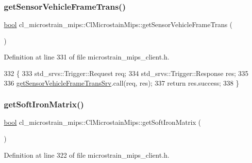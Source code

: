 \subsubsection{\texorpdfstring{get\+Sensor\+Vehicle\+Frame\+Trans()}{getSensorVehicleFrameTrans()}}
{\footnotesize\ttfamily \hyperlink{classbool}{bool} cl\+\_\+microstrain\+\_\+mips\+::\+Cl\+Microstain\+Mips\+::get\+Sensor\+Vehicle\+Frame\+Trans (\begin{DoxyParamCaption}{ }\end{DoxyParamCaption})\hspace{0.3cm}{\ttfamily [inline]}}



Definition at line 331 of file microstrain\+\_\+mips\+\_\+client.\+h.


\begin{DoxyCode}
332     \{
333         std\_srvs::Trigger::Request req;
334         std\_srvs::Trigger::Response res;
335 
336         \hyperlink{classcl__microstrain__mips_1_1ClMicrostainMips_abeafc4f48f26ddd264e61b6cf97c779f}{getSensorVehicleFrameTransSrv}.call(req, res);
337         \textcolor{keywordflow}{return} res.success;
338     \}
\end{DoxyCode}
\mbox{\label{classcl__microstrain__mips_1_1ClMicrostainMips_ad605051aea5b2fe25de85314deb1aa39}} 
\subsubsection{\texorpdfstring{get\+Soft\+Iron\+Matrix()}{getSoftIronMatrix()}}
{\footnotesize\ttfamily \hyperlink{classbool}{bool} cl\+\_\+microstrain\+\_\+mips\+::\+Cl\+Microstain\+Mips\+::get\+Soft\+Iron\+Matrix (\begin{DoxyParamCaption}{ }\end{DoxyParamCaption})\hspace{0.3cm}{\ttfamily [inline]}}



Definition at line 322 of file microstrain\+\_\+mips\+\_\+client.\+h.


